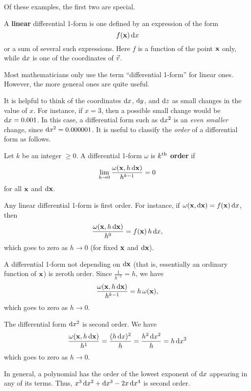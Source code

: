 \documentclass[12pt]{amsart}
\begin{document}
Of these examples, the first two are special.

\begin{defn}
  A \textbf{linear} differential 1-form is one defined by an expression of the form
  \[ f(\mathbf{x}) \, \mathrm{d} x \]
  or a sum of several such expressions.
  Here $f$ is a function of the point $\mathbf{x}$ only, while $\mathrm{d} x$ is one of the coordinates of $\vec{v}$.
\end{defn}

Most mathematicians only use the term ``differential 1-form'' for linear ones.
However, the more general ones are quite useful.

It is helpful to think of the coordinates $\mathrm{d} x$, $\mathrm{d} y$, and $\mathrm{d} z$ as small changes in the value of $x$.
For instance, if $x=3$, then a possible small change would be $\mathrm{d} x = 0.001$.
In this case, a differential form such as $\mathrm{d} x^2$ is an \emph{even smaller} change, since $\mathrm{d} x^2 = 0.000001$.
It is useful to classify the \emph{order} of a differential form as follows.

\begin{defn}
  Let $k$ be an integer $\ge 0$.
  A differential 1-form $\omega$ is \textbf{$k^{\mathrm{th}}$ order} if
  \[ \lim_{h\to 0} \frac{\omega(\mathbf{x},h\,\mathrm{d}\mathbf{x})}{h^{k-1}} = 0 \]
  for all $\mathbf{x}$ and $\mathrm{d}\mathbf{x}$.
\end{defn}

\begin{eg}
  Any linear differential 1-form is first order.
  For instance, if $\omega(\mathbf{x},\mathrm{d}\mathbf{x}) = f(\mathbf{x}) \, \mathrm{d} x$, then
  \[ \frac{\omega(\mathbf{x},h\,\mathrm{d}\mathbf{x})}{h^0} = f(\mathbf{x}) \, h\, \mathrm{d} x,\]
  which goes to zero as $h\to 0$ (for fixed $\mathbf{x}$ and $\mathrm{d}\mathbf{x}$).
\end{eg}

\begin{eg}
  A differential 1-form not depending on $\mathrm{d}\mathbf{x}$ (that is, essentially an ordinary function of $\mathbf{x}$) is zeroth order.
  Since $\frac{1}{h^{-1}} = h$, we have
  \[\frac{\omega(\mathbf{x},h\,\mathrm{d}\mathbf{x})}{h^{k-1}} = h \,\omega(\mathbf{x}),\]
  which goes to zero as $h\to 0$.
\end{eg}

\begin{eg}
  The differential form $\mathrm{d} x^2$ is second order.
  We have
  \[ \frac{\omega(\mathbf{x},h\,\mathrm{d}\mathbf{x})}{h^1} = \frac{(h\,\mathrm{d} x)^2}{h} = \frac{h^2 \, \mathrm{d} x^2}{h} = h \,\mathrm{d} x^2 \]
  which goes to zero as $h\to 0$.
\end{eg}

In general, a polynomial has the order of the lowest exponent of $\mathrm{d} x$ appearing in any of its terms.
Thus, $x^3\, \mathrm{d} x^2 + \mathrm{d} x^3 - 2x \,\mathrm{d} x^4$ is second order.
\end{document}
